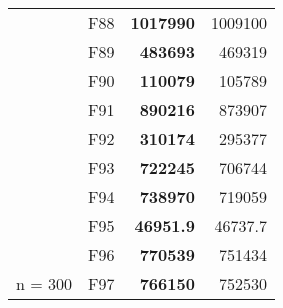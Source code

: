 \begin{table}[]
\begin{tabular}{ll|r|r|}
\multicolumn{1}{|l|}{\cellcolor[HTML]{ECF4FF}}                           & \cellcolor[HTML]{FCE6AB}F88     & \cellcolor[HTML]{D3FFB6}\textbf{1017990}                       & 1009100                                                   \\ \cline{2-4} 
\multicolumn{1}{|l|}{\cellcolor[HTML]{ECF4FF}}                           & \cellcolor[HTML]{FCE6AB}F89     & \cellcolor[HTML]{D3FFB6}\textbf{483693}                        & 469319                                                    \\ \cline{2-4} 
\multicolumn{1}{|l|}{\cellcolor[HTML]{ECF4FF}}                           & \cellcolor[HTML]{FCE6AB}F90     & \cellcolor[HTML]{D3FFB6}\textbf{110079}                        & 105789                                                    \\ \cline{2-4} 
\multicolumn{1}{|l|}{\cellcolor[HTML]{ECF4FF}}                           & \cellcolor[HTML]{FCE6AB}F91     & \cellcolor[HTML]{D3FFB6}\textbf{890216}                        & 873907                                                    \\ \cline{2-4} 
\multicolumn{1}{|l|}{\cellcolor[HTML]{ECF4FF}}                           & \cellcolor[HTML]{FCE6AB}F92     & \cellcolor[HTML]{D3FFB6}\textbf{310174}                        & 295377                                                    \\ \cline{2-4} 
\multicolumn{1}{|l|}{\cellcolor[HTML]{ECF4FF}}                           & \cellcolor[HTML]{FCE6AB}F93     & \cellcolor[HTML]{D3FFB6}\textbf{722245}                        & 706744                                                    \\ \cline{2-4} 
\multicolumn{1}{|l|}{\cellcolor[HTML]{ECF4FF}}                           & \cellcolor[HTML]{FCE6AB}F94     & \cellcolor[HTML]{D3FFB6}\textbf{738970}                        & 719059                                                    \\ \cline{2-4} 
\multicolumn{1}{|l|}{\cellcolor[HTML]{ECF4FF}}                           & \cellcolor[HTML]{FCE6AB}F95     & \cellcolor[HTML]{D3FFB6}\textbf{46951.9}                       & 46737.7                                                   \\ \cline{2-4} 
\multicolumn{1}{|l|}{\cellcolor[HTML]{ECF4FF}}                           & \cellcolor[HTML]{FCE6AB}F96     & \cellcolor[HTML]{D3FFB6}\textbf{770539}                        & 751434                                                    \\ \cline{2-4} 
\multicolumn{1}{|l|}{\multirow{-19}{*}{\cellcolor[HTML]{ECF4FF}n = 300}} & \cellcolor[HTML]{FCE6AB}F97     & \cellcolor[HTML]{D3FFB6}\textbf{766150}                        & 752530                                                    \\ \hline

\end{tabular}
\end{table}
